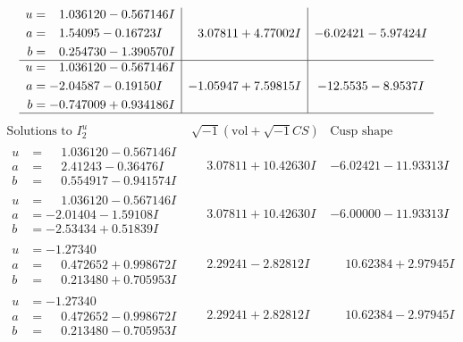 \documentclass[1p]{elsarticle_modified}
\theoremstyle{definition}
\newcommand{\I}{\sqrt{-1}}
\begin{document}
$$\begin{array}{c|c|c}
\begin{aligned}
u &= \phantom{-}1.036120 - 0.567146 I \\
a &= \phantom{-}1.54095 - 0.16723 I \\
b &= \phantom{-}0.254730 - 1.390570 I\end{aligned}
 & \phantom{-}3.07811 + 4.77002 I & -6.02421 - 5.97424 I \\ \hline\begin{aligned}
u &= \phantom{-}1.036120 - 0.567146 I \\
a &= -2.04587 - 0.19150 I \\
b &= -0.747009 + 0.934186 I\end{aligned}
 & -1.05947 + 7.59815 I & -12.5535 - 8.9537 I\\
 \hline 
 \end{array}$$\newpage$$\begin{array}{c|c|c}  
\text{Solutions to }I^u_{2}& \I (\text{vol} + \sqrt{-1}CS) & \text{Cusp shape}\\
 \hline 
\begin{aligned}
u &= \phantom{-}1.036120 - 0.567146 I \\
a &= \phantom{-}2.41243 - 0.36476 I \\
b &= \phantom{-}0.554917 - 0.941574 I\end{aligned}
 & \phantom{-}3.07811 + 10.42630 I & -6.02421 - 11.93313 I \\ \hline\begin{aligned}
u &= \phantom{-}1.036120 - 0.567146 I \\
a &= -2.01404 - 1.59108 I \\
b &= -2.53434 + 0.51839 I\end{aligned}
 & \phantom{-}3.07811 + 10.42630 I & -6.00000 - 11.93313 I \\ \hline\begin{aligned}
u &= -1.27340\phantom{ +0.000000I} \\
a &= \phantom{-}0.472652 + 0.998672 I \\
b &= \phantom{-}0.213480 + 0.705953 I\end{aligned}
 & \phantom{-}2.29241 - 2.82812 I & \phantom{-}10.62384 + 2.97945 I \\ \hline\begin{aligned}
u &= -1.27340\phantom{ +0.000000I} \\
a &= \phantom{-}0.472652 - 0.998672 I \\
b &= \phantom{-}0.213480 - 0.705953 I\end{aligned}
 & \phantom{-}2.29241 + 2.82812 I & \phantom{-}10.62384 - 2.97945 I \\ \hline\begin{aligned}

\end{aligned}
\end{array}$$
\end{document}
